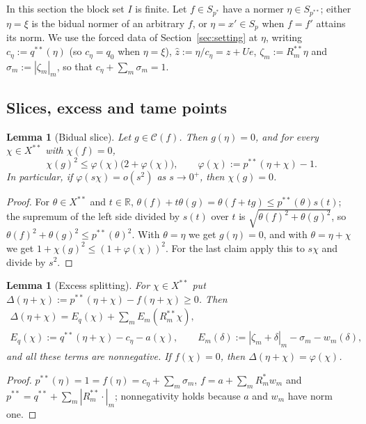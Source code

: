 \documentclass[10pt]{amsart}
\newtheorem{lemma}[theorem]{Lemma}
\theoremstyle{definition}
\theoremstyle{remark}
\newcommand{\R}{\mathbb R}
\newcommand{\Cset}{\mathcal C}
\newcommand{\zh}{\hat z}
\begin{document}
In this section the block set $I$ is finite.  Let $f\in S_{p^*}$ have a
normer $\eta\in S_{p^{**}}$; either $\eta=\xi$ is the bidual normer of an
arbitrary $f$, or $\eta=x'\in S_p$ when $f=f'$ attains its norm.  We use the
forced data of Section~\ref{sec:setting} at $\eta$, writing
$c_\eta:=q^{**}(\eta)$ (so $c_\eta=q_0$ when $\eta=\xi$),
$\zh:=\eta/c_\eta=z+Ue$, $\zeta_m:=R_m^{**}\eta$ and
$\sigma_m:=|\zeta_m|_m$, so that $c_\eta+\sum_m\sigma_m=1$.

\subsection{Slices, excess and tame points}

\begin{lemma}[Bidual slice]\label{lem:slice}
Let $g\in\Cset(f)$.  Then $g(\eta)=0$, and for every $\chi\in X^{**}$ with
$\chi(f)=0$,
\[
 \chi(g)^2\le\varphi(\chi)\big(2+\varphi(\chi)\big),\qquad
 \varphi(\chi):=p^{**}(\eta+\chi)-1 .
\]
In particular, if $\varphi(s\chi)=o(s^2)$ as $s\to0^+$, then $\chi(g)=0$.
\end{lemma}

\begin{proof}
For $\theta\in X^{**}$ and $t\in\R$,
$\theta(f)+t\theta(g)=\theta(f+tg)\le p^{**}(\theta)s(t)$; the supremum of the
left side divided by $s(t)$ over $t$ is $\sqrt{\theta(f)^2+\theta(g)^2}$, so
$\theta(f)^2+\theta(g)^2\le p^{**}(\theta)^2$.  With $\theta=\eta$ we get
$g(\eta)=0$, and with $\theta=\eta+\chi$ we get
$1+\chi(g)^2\le(1+\varphi(\chi))^2$.  For the last claim apply this to
$s\chi$ and divide by $s^2$.
\end{proof}

\begin{lemma}[Excess splitting]\label{lem:excess}
For $\chi\in X^{**}$ put
$\Delta(\eta+\chi):=p^{**}(\eta+\chi)-f(\eta+\chi)\ge0$.  Then
\begin{gather*}
 \Delta(\eta+\chi)=E_q(\chi)+\sum_mE_m(R_m^{**}\chi),\\
 E_q(\chi):=q^{**}(\eta+\chi)-c_\eta-a(\chi),\qquad
 E_m(\delta):=|\zeta_m+\delta|_m-\sigma_m-w_m(\delta),
\end{gather*}
and all these terms are nonnegative.  If $f(\chi)=0$, then
$\Delta(\eta+\chi)=\varphi(\chi)$.
\end{lemma}

\begin{proof}
$p^{**}(\eta)=1=f(\eta)=c_\eta+\sum_m\sigma_m$, $f=a+\sum_mR_m^*w_m$ and
$p^{**}=q^{**}+\sum_m|R_m^{**}\cdot|_m$; nonnegativity holds because $a$ and
$w_m$ have norm one.
\end{proof}
\end{document}
